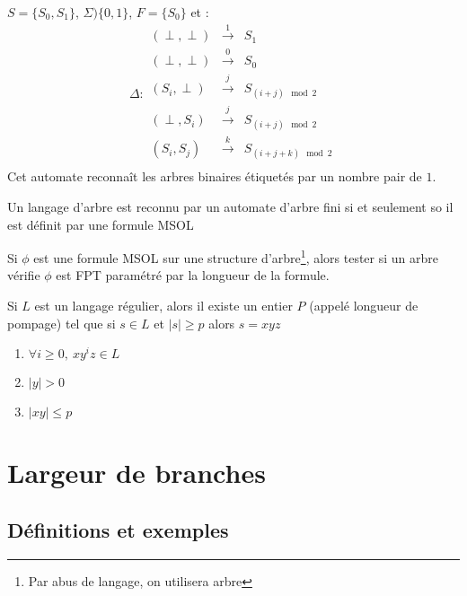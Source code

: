 \documentclass[a4paper, 11pt]{thesis}
\begin{document}
\begin{ex}
    $S = \{S_0, S_1\}$, $\Sigma ) \{0, 1\}$, $F = \{S_0\}$ et : \[
        \Delta : \begin{array}{rcl}
            (\perp, \perp) & \xrightarrow{1} & S_1 \\
            (\perp, \perp) & \xrightarrow{0} & S_0 \\
            (S_i, \perp)   & \xrightarrow{j} & S_{(i + j) \mod 2} \\
            (\perp, S_i)   & \xrightarrow{j} & S_{(i + j) \mod 2} \\
            (S_i, S_j)     & \xrightarrow{k} & S_{(i+j+k) \mod 2} \\
        \end{array}
    \]
    Cet automate reconnaît les arbres binaires étiquetés par un nombre pair de $1$.
\end{ex}

\begin{lemma}
    Un langage d'arbre est reconnu par un automate d'arbre fini si et seulement so il est définit
    par une formule MSOL
\end{lemma}

\begin{corol}
    Si $\phi$ est une formule MSOL sur une structure d'arbre\footnote{Par abus de langage, on
    utilisera arbre}, alors tester si un arbre vérifie $\phi$ est FPT paramétré par la longueur de
    la formule.
\end{corol}


\begin{lemma}
    Si $L$ est un langage régulier, alors il existe un entier $P$ (appelé longueur de pompage) tel
    que si $s \in L$ et $|s| \geq p$ alors $s = xyz$ \begin{enumerate}
        \item $\forall i \geq 0,\ xy^iz \in L$
        \item $|y|  > 0$
        \item $|xy| \leq p$
    \end{enumerate}
\end{lemma}

\section{Largeur de branches}

\subsection{Définitions et exemples}
\end{document}
